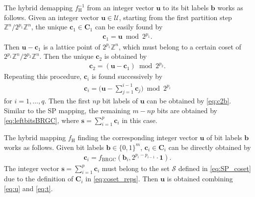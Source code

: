 \documentclass[journal]{IEEEtran}
\newcommand{\Z}{\mathbb{Z}}
\newcommand{\U}{\mathcal{U}}
\newcommand{\bb}{\boldsymbol{b}}
\newcommand{\bc}{\boldsymbol{c}}
\newcommand{\bh}{\boldsymbol{h}}
\newcommand{\bs}{\boldsymbol{s}}
\newcommand{\bt}{\boldsymbol{t}}
\newcommand{\bu}{\boldsymbol{u}}
\newcommand{\bC}{\boldsymbol{C}}
\newcommand{\bzero}{\boldsymbol{0}}
\newcommand{\bone}{\boldsymbol{1}}
\newcommand{\blambda}{\boldsymbol{\lambda}}
\begin{document}
The hybrid demapping $f^{-1}_{\text{H}}$ from an integer vector $\bu$ to its bit labels $\bb$ works as follows. Given an integer vector $\bu \in \U$, starting from the first partition step $\Z^n/2^{p_1}\Z^n$, the unique $\bc_1\in\bC_1$ can be easily found by 
\begin{align}
    \bc_1=\bu \bmod 2^{p_1}.
\end{align}
 Then $\bu-\bc_1$ is a lattice point of $2^{p_1}\Z^n$, which must belong to a certain coset of $2^{p_1}\Z^n/2^{p_2}\Z^n$. Then the unique $\bc_2$ is obtained by
 \begin{align}
     \bc_2=(\bu-\bc_1) \bmod 2^{p_2}.
 \end{align}
 Repeating this procedure, $\bc_i$ is found successively by
 \begin{align}\label{eq:ciH}
     \bc_i=\biggl(\bu-\sum_{j=1}^{i-1}\bc_j\biggr) \bmod 2^{p_i}
 \end{align}
 for $i=1,\ldots, q$. Then the first $np$ bit labels of $\bu$ can be obtained by \eqref{eq:c2b}. Similar to the SP mapping, the remaining $m-np$ bits are obtained by \eqref{eq:leftbitsBRGC}, where $\bs=\sum_{i=1}^p \bc_i$ in this case.


The hybrid mapping $f_{\text{H}}$ finding the corresponding integer vector $\bu$ of bit labels $\bb$ works as follows. Given bit labels $\bb\in\{0,1\}^m$, $\bc_i \in \bC_i$ can be directly obtained by
\begin{align}
    \bc_i =f_{\text{BRGC}}(\bb_i,2^{p_i-p_{i-1}}\cdot\bone).\label{eq:b2c}
\end{align}
The integer vector $\bs=\sum_{i=1}^p \bc_i$ must belong to the set $\mathcal{S}$ defined in \eqref{eq:SP_coset} due to the definition of $\bC_i$ in \eqref{eq:coset_reps}. Then $\bu$ is obtained combining \eqref{eq:u} and \eqref{eq:t}. 
\end{document}
